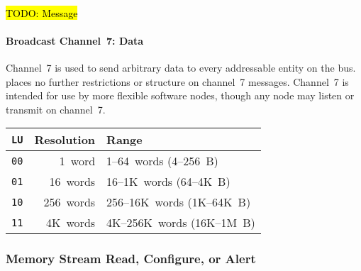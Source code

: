 ~

\hl{TODO: Message}



\paragraph{Broadcast Channel~7: Data}
\label{scratch:scratch:sec:channel-7}
Channel~7 is used to send arbitrary data to every addressable entity on the
bus. \bus places no further restrictions or structure on channel~7 messages.
Channel~7 is intended for use by more flexible software nodes, though any node
may listen or transmit on channel~7.


    \begin{tabular}{r|r|l}
      {\tt LU} & Resolution & Range \\
      \hline
      {\tt 00} & 1~word     & 1--64~words (4--256~B) \\
      {\tt 01} & 16~words   & 16--1K~words (64--4K~B) \\
      {\tt 10} & 256~words  & 256--16K~words (1K--64K~B) \\
      {\tt 11} & 4K~words   & 4K--256K~words (16K--1M~B) \\
    \end{tabular}

\subsubsection{Memory Stream Read, Configure, or Alert}
\label{scratch:cmd:mem-stream-multi}

